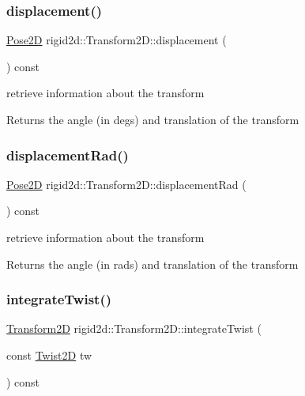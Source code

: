 \subsubsection{\texorpdfstring{displacement()}{displacement()}}
{\footnotesize\ttfamily \hyperlink{structrigid2d_1_1Pose2D}{Pose2D} rigid2d\+::\+Transform2\+D\+::displacement (\begin{DoxyParamCaption}{ }\end{DoxyParamCaption}) const}



retrieve information about the transform 

\begin{DoxyReturn}{Returns}
the angle (in degs) and translation of the transform 
\end{DoxyReturn}
\mbox{\label{classrigid2d_1_1Transform2D_a95c036e753f2a5a44086a15462c20064}} 
\subsubsection{\texorpdfstring{displacement\+Rad()}{displacementRad()}}
{\footnotesize\ttfamily \hyperlink{structrigid2d_1_1Pose2D}{Pose2D} rigid2d\+::\+Transform2\+D\+::displacement\+Rad (\begin{DoxyParamCaption}{ }\end{DoxyParamCaption}) const}



retrieve information about the transform 

\begin{DoxyReturn}{Returns}
the angle (in rads) and translation of the transform 
\end{DoxyReturn}
\mbox{\label{classrigid2d_1_1Transform2D_ae8b441ce0be1b5ea4176f81fe596e5a5}} 
\subsubsection{\texorpdfstring{integrate\+Twist()}{integrateTwist()}}
{\footnotesize\ttfamily \hyperlink{classrigid2d_1_1Transform2D}{Transform2D} rigid2d\+::\+Transform2\+D\+::integrate\+Twist (\begin{DoxyParamCaption}\item[{const \hyperlink{structrigid2d_1_1Twist2D}{Twist2D}}]{tw }\end{DoxyParamCaption}) const}



